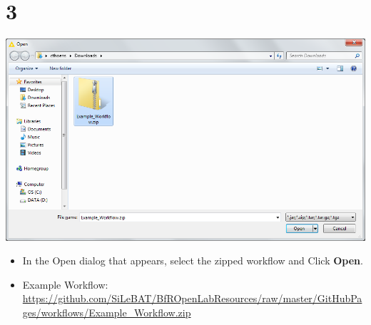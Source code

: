\documentclass{beamer}
\begin{document}
\section{3}
\begin{frame}
	\begin{center}
  		\includegraphics[height=0.6\textheight]{3.png}
	\end{center}
	\begin{itemize}
		\item In the Open dialog that appears, select the zipped workflow and Click \textbf{Open}.
		\item Example Workflow: \url{https://github.com/SiLeBAT/BfROpenLabResources/raw/master/GitHubPages/workflows/Example_Workflow.zip}
	\end{itemize}
\end{frame}
\end{document}
